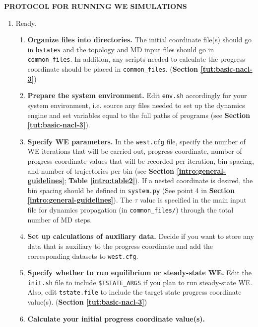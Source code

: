 \newpage
\onecolumn
\begin{center}
\begin{LARGE}
    \textbf{PROTOCOL FOR RUNNING WE SIMULATIONS}
\end{LARGE}
\end{center}
\renewcommand{\theenumi}{\Roman{enumi}}
\renewcommand{\labelenumi}{\theenumi}
\renewcommand{\theenumii}{\arabic{enumii}}
\renewcommand{\labelenumii}{(\theenumii)}
\begin{enumerate}
\item Ready.
\begin{enumerate}
\item \textbf{Organize files into directories.} 
The initial coordinate file(s) should go in \verb|bstates| and the topology and MD input files should go in \verb|common_files|. 
In addition, any scripts needed to calculate the progress coordinate should be placed in \verb|common_files|. (\textbf{Section \ref{tut:basic-nacl-3}})
\item \textbf{Prepare the system environment.}  
Edit \verb|env.sh| accordingly for your system environment, i.e. source any files needed to set up the dynamics engine and set variables equal to the full paths of programs (see \textbf{Section \ref{tut:basic-nacl-3}}). 
\item \textbf{Specify WE parameters.}  
In the \verb|west.cfg| file, specify the number of WE iterations that will be carried out, progress coordinate, number of progress coordinate values that will be recorded per iteration, bin spacing, and number of trajectories per bin (see \textbf{Section \ref{intro:general-guidelines}}; \textbf{Table \ref{intro:table2}}).  
If a nested coordinate is desired, the bin spacing should be defined in \verb|system.py| (See point 4 in \textbf{Section \ref{intro:general-guidelines}}).  
The $\tau$ value is specified in the main input file for dynamics propagation (in \verb|common_files/|) through the total number of MD steps.  
\item \textbf{Set up calculations of auxiliary data.} 
Decide if you want to store any data that is auxiliary to the progress coordinate and add the corresponding datasets to \verb|west.cfg|.
\item \textbf{Specify whether to run equilibrium or steady-state WE.}
Edit the \verb|init.sh| file to include \verb|$TSTATE_ARGS| if you plan to run steady-state WE.  
Also, edit \verb|tstate.file| to include the target state progress coordinate value(s). (\textbf{Section \ref{tut:basic-nacl-3}}) 
\item \textbf{Calculate your initial progress coordinate value(s).}

\end{enumerate}
\end{enumerate}
